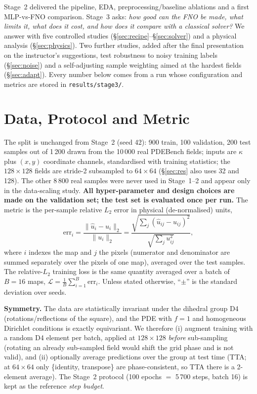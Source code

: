 \documentclass[11pt,a4paper]{article}
\begin{document}
Stage~2 delivered the pipeline, EDA, preprocessing/baseline ablations and a first MLP-vs-FNO comparison. Stage~3 asks: \emph{how good can the FNO be made, what limits it, what does it cost, and how does it compare with a classical solver?} We answer with five controlled studies (\S\ref{sec:recipe}--\S\ref{sec:solver}) and a physical analysis (\S\ref{sec:physics}). Two further studies, added after the final presentation on the instructor's suggestions, test robustness to noisy training labels (\S\ref{sec:noise}) and a self-adjusting sample weighting aimed at the hardest fields (\S\ref{sec:adapt}). Every number below comes from a run whose configuration and metrics are stored in \texttt{results/stage3/}.

\section{Data, Protocol and Metric}
The split is unchanged from Stage~2 (seed 42): 900 train, 100 validation, 200 test samples out of 1\,200 drawn from the 10\,000 real PDEBench fields; inputs are $\kappa$ plus $(x,y)$ coordinate channels, standardised with training statistics; the $128\times128$ fields are stride-2 subsampled to $64\times64$ (\S\ref{sec:res} also uses 32 and 128). The other 8\,800 real samples were never used in Stage~1--2 and appear only in the data-scaling study. \textbf{All hyper-parameter and design choices are made on the validation set; the test set is evaluated once per run.} The metric is the per-sample relative $L_2$ error in physical (de-normalised) units, \[\mathrm{err}_i=\frac{\|\hat u_i-u_i\|_2}{\|u_i\|_2}=\frac{\sqrt{\sum_{j}(\hat u_{ij}-u_{ij})^2}}{\sqrt{\sum_{j}u_{ij}^2}},\] where $i$ indexes the map and $j$ the pixels (numerator and denominator are summed separately over the pixels of one map), averaged over the test samples. The relative-$L_2$ training loss is the same quantity averaged over a batch of $B=16$ maps, $\mathcal L=\frac1B\sum_{i=1}^{B}\mathrm{err}_i$. Unless stated otherwise, ``$\pm$'' is the standard deviation over seeds.

\textbf{Symmetry.} The data are statistically invariant under the dihedral group D4 (rotations/reflections of the square), and the PDE with $f=1$ and homogeneous Dirichlet conditions is exactly equivariant. We therefore (i) augment training with a random D4 element per batch, applied at $128\times128$ \emph{before} sub-sampling (rotating an already sub-sampled field would shift the grid phase and is not valid), and (ii) optionally average predictions over the group at test time (TTA; at $64\times64$ only \{identity, transpose\} are phase-consistent, so TTA there is a 2-element average). The Stage~2 protocol (100 epochs $=$ 5\,700 steps, batch 16) is kept as the reference \emph{step budget}.
\end{document}
